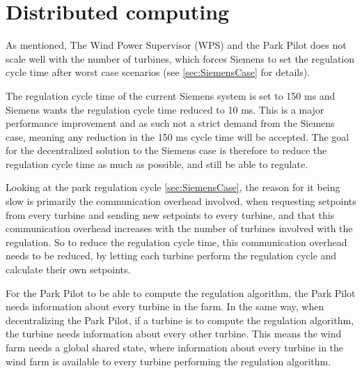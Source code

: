 \section{Distributed computing}

As mentioned, The Wind Power Supervisor (WPS) and the Park Pilot does not scale well with the number of turbines, which forces Siemens to set the regulation cycle time after worst case scenarios (see \cref{sec:SiemensCase} for details). 


The regulation cycle time of the current Siemens system is set to 150 ms and Siemens wants the regulation cycle time reduced to 10 ms. This is a major performance improvement and as such not a strict demand from the Siemens case, meaning any reduction in the 150 ms cycle time will be accepted. The goal for the decentralized solution to the Siemens case is therefore to reduce the regulation cycle time as much as possible, and still be able to regulate.

Looking at the park regulation cycle \cref{sec:SiemensCase}, the reason for it being slow is primarily the communication overhead involved, when requesting setpoints from every turbine and sending new setpoints to every turbine, and that this communication overhead increases with the number of turbines involved with the regulation. So to reduce the regulation cycle time, this communication overhead needs to be reduced, by letting each turbine perform the regulation cycle and calculate their own setpoints. 


For the Park Pilot to be able to compute the regulation algorithm, the Park Pilot needs information about every turbine in the farm. In the same way, when decentralizing the Park Pilot, if a turbine is to compute the regulation algorithm, the turbine needs information about every other turbine. This means the wind farm needs a global shared state, where information about every turbine in the wind farm is available to every turbine performing the regulation algorithm. 

